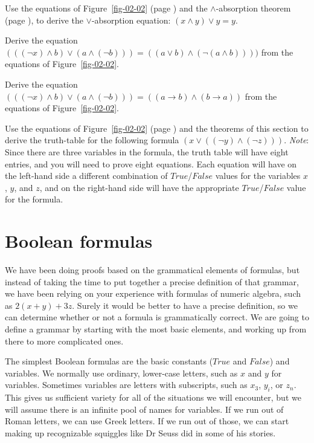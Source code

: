 \begin{ExerciseList}
\Exercise
Use the equations of Figure~\ref{fig-02-02} (page \pageref{fig-02-02})
and the $\wedge$-absorption theorem (page \pageref{and-absorption-thm}),
to derive the $\vee$-absorption equation: $(x \wedge y) \vee y = y$.

\Exercise
Derive the equation
$(((\neg x) \wedge b) \vee (a \wedge (\neg b))) = ((a \vee b) \wedge (\neg(a \wedge b))))$
from the equations of Figure~\ref{fig-02-02}.

\Exercise
Derive the equation
$(((\neg x) \wedge b) \vee (a \wedge (\neg b))) = ((a \rightarrow b) \wedge (b \rightarrow a))$
from the equations of Figure~\ref{fig-02-02}.

\Exercise
Use the equations of Figure~\ref{fig-02-02} (page \pageref{fig-02-02})
and the theorems of this section to
derive the truth-table for the following formula $(x \vee ((\neg y) \wedge (\neg z)))$.
\emph{Note}: Since there are three variables in the formula, the truth table
will have eight entries, and you will need to prove eight equations.
Each equation will have on the left-hand side
a different combination of $True$/$False$ values for the variables $x$, $y$, and $z$,
and on the right-hand side will have the appropriate $True$/$False$ value for the formula.
\end{ExerciseList}

\section{Boolean formulas}
\label{sec:boolean-formuas}

We have been doing proofs based on the grammatical elements of formulas, but instead of taking the time to put together a precise definition of that grammar, we have been relying on your experience with formulas of numeric algebra, such as $2(x + y) + 3z$. Surely it would be better to have a precise definition, so we can determine whether or not a formula is grammatically correct. We are going to define a grammar by starting with the most basic elements, and working up from there to more complicated ones.

The simplest Boolean formulas are the basic constants ($True$ and $False$) and variables. We normally use ordinary, lower-case letters, such as $x$ and $y$ for variables. Sometimes variables are letters with subscripts, such as $x_3$, $y_i$, or $z_n$. This gives us sufficient variety for all of the situations we will encounter, but we will assume there is an infinite pool of names for variables. If we run out of Roman letters, we can use Greek letters. If we run out of those, we can start making up recognizable squiggles like Dr Seuss did in some of his stories.


